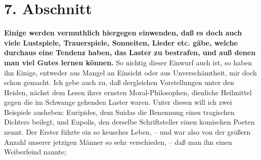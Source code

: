 \section{7. Abschnitt} \label{kap17_ab7}

\textbf{Einige werden vermuthlich hiergegen einwenden, daß es doch auch viele
Lustspiele, Trauerspiele, Sonneiten, Lieder etc. gäbe, welche durchaus eine
Tendenz haben, das Laster zu bestrafen, und auß denen man viel Gutes lernen
können.} So nichtig dieser Einwurf auch ist, so haben ihn Einige, entweder aus
Mangel an Einsicht oder aus Unverschämtheit, mir doch schon gemacht. Ich gebe
auch zu, daß dergleichen Vorstellungen unter den Heiden, nächst dem Lesen ihrer
ernsten Moral-Philosophen, dienliche Heilmittel gegen die im Schwange gehenden
Laster waren. Unter diesen will ich zwei Beispiele ausheben:
Euripides, dem
Suidas die Benennung eines tragischen Dichters beilegt, und
Eupolis, den
derselbe Schriftsteller einen komischen Poeten nennt. Der Erster führte ein so
keusches Leben, -- und war also von der größern Anzahl unserer jetzigen Männer
so sehr verschieden, -- daß man ihn einen Weiberfeind nannte;

\medskip


